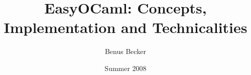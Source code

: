 \documentclass[11pt,titlepage,abstracton]{scrartcl} %
\title{EasyOCaml: Concepts, Implementation and Technicalities}
\author{Benus Becker}
\date{Summer 2008}
\begin{document}






\begin{appendix}
  \clearpage
  \clearpage
  \clearpage
  
  \clearpage
\end{appendix}
\end{document}
